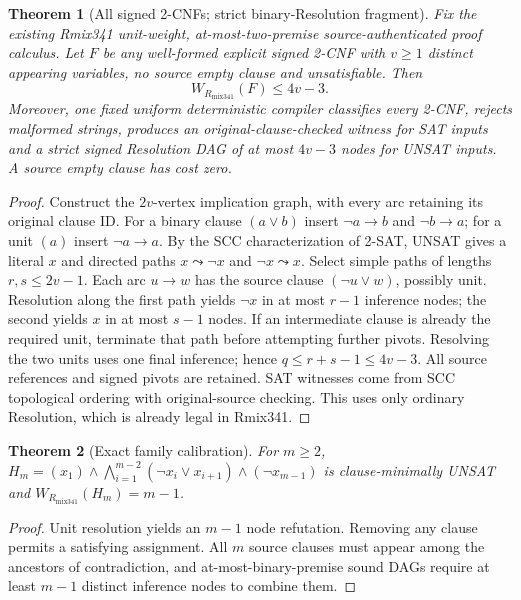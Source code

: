 \documentclass{article}
\newtheorem{theorem}{Theorem}
\begin{document}
\begin{theorem}[All signed 2-CNFs; strict binary-Resolution fragment]
Fix the existing Rmix341 unit-weight, at-most-two-premise source-authenticated proof calculus. Let $F$ be any well-formed explicit signed 2-CNF with $v\ge1$ \emph{distinct appearing variables}, no source empty clause and unsatisfiable. Then
\[
W_{R_{\mathrm{mix341}}}(F)\le 4v-3.
\]
Moreover, one fixed uniform deterministic compiler classifies every 2-CNF, rejects malformed strings, produces an original-clause-checked witness for SAT inputs and a strict signed Resolution DAG of at most $4v-3$ nodes for UNSAT inputs. A source empty clause has cost zero.
\end{theorem}
\begin{proof}
Construct the $2v$-vertex implication graph, with every arc retaining its original clause ID. For a binary clause $(a\vee b)$ insert $\neg a\to b$ and $\neg b\to a$; for a unit $(a)$ insert $\neg a\to a$. By the SCC characterization of 2-SAT, UNSAT gives a literal $x$ and directed paths $x\leadsto\neg x$ and $\neg x\leadsto x$. Select simple paths of lengths $r,s\le2v-1$. Each arc $u\to w$ has the source clause $(\neg u\vee w)$, possibly unit. Resolution along the first path yields $\neg x$ in at most $r-1$ inference nodes; the second yields $x$ in at most $s-1$ nodes. If an intermediate clause is already the required unit, terminate that path before attempting further pivots. Resolving the two units uses one final inference; hence $q\le r+s-1\le4v-3$. All source references and signed pivots are retained. SAT witnesses come from SCC topological ordering with original-source checking. This uses only ordinary Resolution, which is already legal in Rmix341.
\end{proof}
\begin{theorem}[Exact family calibration]
For $m\ge2$, $H_m=(x_1)\wedge\bigwedge_{i=1}^{m-2}(\neg x_i\vee x_{i+1})\wedge(\neg x_{m-1})$ is clause-minimally UNSAT and $W_{R_{\mathrm{mix341}}}(H_m)=m-1$.
\end{theorem}
\begin{proof}
Unit resolution yields an $m-1$ node refutation. Removing any clause permits a satisfying assignment. All $m$ source clauses must appear among the ancestors of contradiction, and at-most-binary-premise sound DAGs require at least $m-1$ distinct inference nodes to combine them.
\end{proof}
\end{document}

